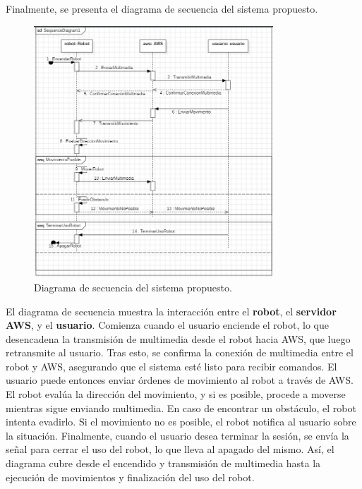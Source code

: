         Finalmente, se presenta el diagrama de secuencia del sistema propuesto.
        \vskip 0.5cm
            \begin{figure}[htbp]
                \centering
                \includegraphics[width=0.8\textwidth]{images/desarrollo/diagramas/Secuencia.jpeg}
                \caption{Diagrama de secuencia del sistema propuesto.}
                \label{fig:Secuencia}
            \end{figure}
        \vskip 0.5cm
        El diagrama de secuencia muestra la interacci\'on entre el \textbf{robot}, el \textbf{servidor AWS}, y el \textbf{usuario}. Comienza cuando 
        el usuario enciende el robot, lo que desencadena la transmisi\'on de multimedia desde el robot hacia AWS, que luego retransmite 
        al usuario. Tras esto, se confirma la conexi\'on de multimedia entre el robot y AWS, asegurando que el sistema est\'e listo para 
        recibir comandos.
        \vskip 0.5cm
        El usuario puede entonces enviar \'ordenes de movimiento al robot a trav\'es de AWS. El robot eval\'ua la direcci\'on del movimiento, 
        y si es posible, procede a moverse mientras sigue enviando multimedia. En caso de encontrar un obst\'aculo, el robot intenta 
        evadirlo. Si el movimiento no es posible, el robot notifica al usuario sobre la situaci\'on.
        \vskip 0.5cm
        Finalmente, cuando el usuario desea terminar la sesi\'on, se env\'ia la se\~nal para cerrar el uso del robot, lo que lleva al apagado 
        del mismo. As\'i, el diagrama cubre desde el encendido y transmisi\'on de multimedia hasta la ejecuci\'on de movimientos y finalizaci\'on 
        del uso del robot.
        \vskip 0.5cm
            